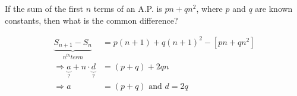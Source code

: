 
%
%
%
%
% 
% 


\question If the sum of the first $n$ terms of an A.P. is $pn + qn^2$, where $p$ 
and $q$ are known constants, then what is the common difference? 

\insertQR{}

\ifprintanswers
\fi 

\begin{solution}
	\begin{align}
		\underbrace{S_{n+1} - S_n}_{n^{th} term} &= p(n+1) + q(n+1)^2 - [pn + qn^2] \\
		\Rightarrow \underbrace{a}_{?} + n\cdot\underbrace{d}_{?} &= (p+q) + 2qn \\
		\Rightarrow a &= (p+q) \text{ and } d = 2q
	\end{align}
\end{solution}
